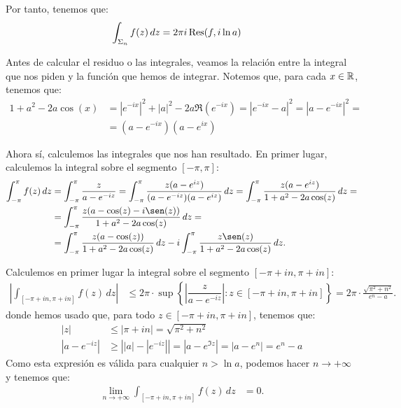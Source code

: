 \begin{ejercicio}
    Por tanto, tenemos que:
    \begin{align*}
        \int_{\Sigma_n} f(z) \, dz &= 2\pi i\operatorname{Res}(f, i\ln a)
    \end{align*}

    Antes de calcular el residuo o las integrales, veamos la relación entre la integral que nos piden y la función que hemos de integrar. Notemos que, para cada $x\in \mathbb{R}$, tenemos que:
    \begin{align*}
        1+a^2 - 2a\cos(x) &= |e^{-ix}|^2 + |a|^2 - 2a\Re\left(e^{-ix}\right)
        = |e^{-ix} - a|^2 = |a - e^{-ix}|^2 =\\&= (a - e^{-ix})(a - e^{ix})
    \end{align*}

    Ahora sí, calculemos las integrales que nos han resultado. En primer lugar, calculemos la integral sobre el segmento $[-\pi, \pi]$:
    \begin{align*}
        \int_{-\pi}^{\pi} f(z) \, dz &= \int_{-\pi}^{\pi} \frac{z}{a - e^{-i z}}
        = \int_{-\pi}^{\pi} \frac{z (a - e^{i z})}{(a - e^{-i z})(a - e^{i z})} \, dz
        = \int_{-\pi}^{\pi} \frac{z (a - e^{i z})}{1 + a^2 - 2a\cos(z)} \, dz
        =\\&= \int_{-\pi}^{\pi} \frac{z (a - \cos(z) - i\sen(z))}{1 + a^2 - 2a\cos(z)} \, dz
        =\\&= \int_{-\pi}^{\pi} \frac{z (a - \cos(z))}{1 + a^2 - 2a\cos(z)} \, dz
        - i\int_{-\pi}^{\pi} \frac{z \sen(z)}{1 + a^2 - 2a\cos(z)} \, dz.
    \end{align*}

    Calculemos en primer lugar la integral sobre el segmento $[-\pi + i n, \pi + i n]$:
    \begin{align*}
        \left|\int_{[-\pi + i n, \pi + i n]} f(z) \, dz\right| &\leq 2\pi\cdot \sup\left\{\left|\dfrac{z}{a - e^{-i z}}\right| : z\in [-\pi + i n, \pi + i n]\right\}
        = 2\pi\cdot \frac{\sqrt{\pi^2 + n^2}}{e^{n} - a}.
    \end{align*}
    donde hemos usado que, para todo $z\in [-\pi + i n, \pi + i n]$, tenemos que:
    \begin{align*}
        |z| &\leq |\pi + i n| = \sqrt{\pi^2 + n^2}\\
        |a - e^{-i z}| &\geq \left||a| - |e^{-i z}|\right| = \left|a - e^{\Im z}\right| = \left|a - e^{n}\right| = e^{n} - a
    \end{align*}
    Como esta expresión es válida para cualquier $n > \ln a$, podemos hacer $n \to +\infty$ y tenemos que:
    \begin{align*}
        \lim_{n\to+\infty} \int_{[-\pi + i n, \pi + i n]} f(z) \, dz &= 0.
    \end{align*}


\end{ejercicio}
